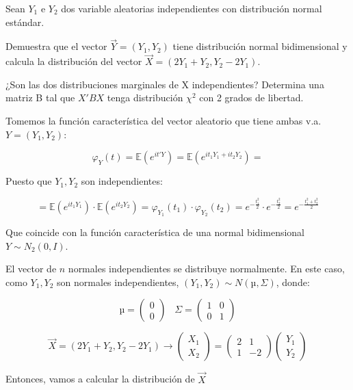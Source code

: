 \begin{problem}[4]
\label{ejrc:4-hoja1}
Sean $Y_1$ e $Y_2$ dos variable aleatorias independientes con distribución normal estándar.

\ppart  Demuestra que el vector $\vec{Y} = (Y_1 , Y_2 )$ tiene distribución normal bidimensional y calcula la distribución del vector $\vec{X} = (2Y_1 + Y_2 , Y_2 − 2Y_1 )$.

\ppart  ¿Son las dos distribuciones marginales de X independientes? Determina una matriz B tal que $X'BX$ tenga distribución $χ^2$ con 2 grados de libertad.
\solution


\spart
{}

Tomemos la función característica del vector aleatorio que tiene ambas v.a. $Y=(Y_1,Y_2)$:

\[φ_Y(t) = \mathbb{E}(e^{it'Y}) = \mathbb{E}(e^{it_1Y_1+it_2Y_2})=\]

Puesto que $Y_1,Y_2$ son independientes:

\[= \mathbb{E}(e^{it_1Y_1})·\mathbb{E}(e^{it_2Y_2}) = φ_{Y_1}(t_1)·φ_{Y_2}(t_2) = e^{-\frac{t_1^2}{2}}·e^{-\frac{t_2^2}{2}}= e^{-\frac{t_1^2+t_2^2}{2}}\]

Que coincide con la función característica de una normal bidimensional $Y\sim N_2(0,I)$.

El vector de $n$ normales independientes se distribuye normalmente. En este caso, como $Y_1,Y_2$ son normales independientes, $(Y_1,Y_2) \sim N(µ,Σ)$, donde:

\[µ = \begin{pmatrix}0\\0\end{pmatrix}\;\;\; Σ = \begin{pmatrix}1&0\\0&1\end{pmatrix}\]

\[\vec{X} = (2Y_1 + Y_2 , Y_2 − 2Y_1 ) \to \begin{pmatrix}X_1\\X_2\end{pmatrix} = \begin{pmatrix}2&1\\1&-2\end{pmatrix}\begin{pmatrix}Y_1\\Y_2\end{pmatrix}\]

Entonces, vamos a calcular la distribución de $\vec{X}$


\end{problem}

